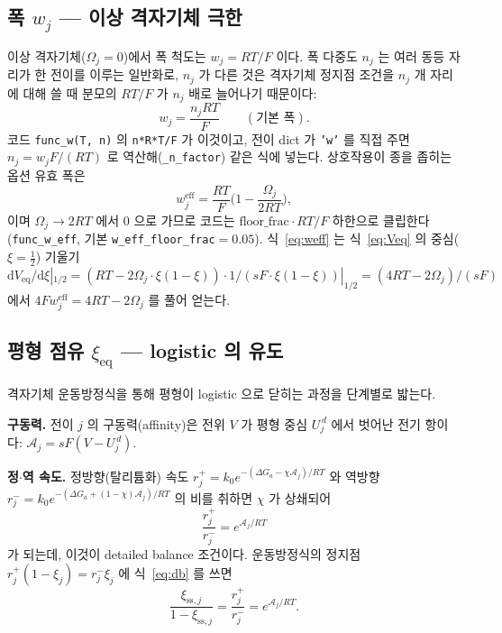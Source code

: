\documentclass[11pt,a4paper]{article}
\newcommand{\dd}{\mathrm{d}}
\newcommand{\eff}{\mathrm{eff}}
\newcommand{\eq}{\mathrm{eq}}
\newcommand{\sstat}{\mathrm{ss}}
\newcommand{\code}[1]{\texttt{#1}}
\begin{document}
\subsection{폭 $w_j$ — 이상 격자기체 극한}
이상 격자기체($\Omega_j=0$)에서 폭 척도는 $w_j=RT/F$ 이다. 폭 다중도 $n_j$ 는 여러 동등 자리가 한 전이를
이루는 일반화로, $n_j$ 가 다른 것은 격자기체 정지점 조건을 $n_j$ 개 자리에 대해 쓸 때 분모의 $RT/F$ 가
$n_j$ 배로 늘어나기 때문이다:
\begin{equation}
w_j=\frac{n_jRT}{F}\qquad(\text{기본 폭}).
\label{eq:wbase}
\end{equation}
코드 \code{func\_w(T, n)} 의 \code{n*R*T/F}
가 이것이고, 전이 dict 가 \code{'w'} 를 직접 주면 $n_j=w_jF/(RT)$ 로 역산해(\code{\_n\_factor}) 같은 식에 넣는다.
상호작용이 종을 좁히는 옵션 유효 폭은
\begin{equation}
w_j^\eff=\frac{RT}{F}\Big(1-\frac{\Omega_j}{2RT}\Big),
\label{eq:weff}
\end{equation}
이며 $\Omega_j\to2RT$ 에서 $0$ 으로 가므로 코드는 $\mathrm{floor\_frac}\cdot RT/F$ 하한으로 클립한다(\code{func\_w\_eff},
기본 \code{w\_eff\_floor\_frac}$=0.05$). 식~\eqref{eq:weff} 는 식~\eqref{eq:Veq} 의 중심($\xi=\tfrac12$) 기울기
$\dd V_{\eq}/\dd\xi|_{1/2}=(RT-2\Omega_j\cdot\xi(1-\xi))\cdot 1/(sF\cdot\xi(1-\xi))|_{1/2}=(4RT-2\Omega_j)/(sF)$ 에서
$4Fw_j^\eff=4RT-2\Omega_j$ 를 풀어 얻는다.

\subsection{평형 점유 $\xi_\eq$ — logistic 의 유도}
격자기체 운동방정식을 통해 평형이 logistic 으로 닫히는 과정을 단계별로 밟는다.

\textbf{구동력.} 전이 $j$ 의 구동력(affinity)은 전위 $V$ 가 평형 중심 $U_j^{\,d}$ 에서 벗어난 전기 항이다:
$\mathcal A_j=sF(V-U_j^{\,d})$.

\textbf{정$\cdot$역 속도.} 정방향(탈리튬화) 속도 $r_j^+=k_0 e^{-(\Delta G_a-\chi\mathcal A_j)/RT}$ 와 역방향
$r_j^-=k_0 e^{-(\Delta G_a+(1-\chi)\mathcal A_j)/RT}$ 의 비를 취하면 $\chi$ 가 상쇄되어
\begin{equation}
\frac{r_j^+}{r_j^-}=e^{\mathcal A_j/RT}
\label{eq:db}
\end{equation}
가 되는데, 이것이 detailed balance 조건이다. 운동방정식의 정지점 $r_j^+(1-\xi_j)=r_j^-\xi_j$ 에 식~\eqref{eq:db} 를 쓰면
\begin{equation}
\frac{\xi_{\sstat,j}}{1-\xi_{\sstat,j}}=\frac{r_j^+}{r_j^-}=e^{\mathcal A_j/RT}.
\label{eq:stationary}
\end{equation}
\end{document}
